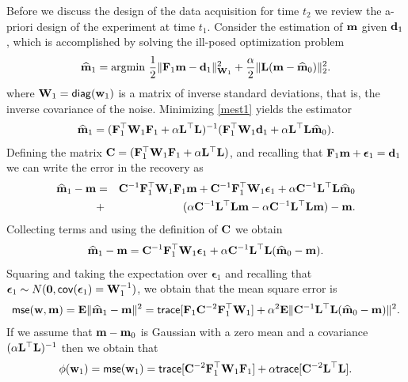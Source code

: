 \documentclass[11pt]{article}
\newcommand{\bfC}	{{\bf{C}}}
\newcommand{\bfE}	{{\bf{E}}}
\newcommand{\bfF}	{{\bf{F}}}
\newcommand{\bfL}	{{\bf{L}}}
\newcommand{\bfW}	{{\bf{W}}}
\newcommand{\bfd}	{{\bf{d}}}
\newcommand{\bfm}	{{\bf{m}}}
\newcommand{\bfw}	{{\bf{w}}}
\newcommand{\hf}        {{\frac 12}}
\newcommand{\bfepsilon} {{\boldsymbol \epsilon}}
\newcommand{\LtL}       { \bfL^{\top}\bfL}
\newcommand {\zero}  { {\bf 0} }
\renewcommand{\hf}		 {\frac12}
\newcommand{\bfmhat}    {{\widehat{\bfm}}}
\begin{document}
Before we discuss the design of the data acquisition for time $t_{2}$
 we review the a-priori design of the experiment at time $t_{1}$.  
Consider  the estimation of $\bfm$ given $\bfd_{1}$, which is accomplished by solving the ill-posed optimization problem
\begin{eqnarray*}
\label{mest1}
\widehat \bfm_{1} = {\rm arg}{\min} \ \hf \| \bfF_{1} \bfm - \bfd_{1}\|^{2}_{\bfW_{1}} + {\frac {\alpha} 2}
\|\bfL (\bfm - \bfmhat_{0}) \|^{2}_2. 
\end{eqnarray*}
where $\bfW_{1} = {\sf diag}(\bfw_{1})$ is a matrix of inverse standard deviations, 
that is, the inverse covariance of the noise.
Minimizing \eqref{mest1} yields the estimator
\begin{eqnarray}
\label{mest}
\widehat \bfm_{1} = (\bfF_{1}^{\top} \bfW_{1}\bfF_{1} + \alpha \bfL^{\top} \bfL)^{-1} (\bfF_{1}^{\top} \bfW_{1} \bfd_{1}
+ \alpha \LtL \bfmhat_{0}).
\end{eqnarray}
Defining the matrix $\bfC = (\bfF_{1}^{\top} \bfW_{1}\bfF_{1} + \alpha \LtL)$, and recalling that $\bfF_1\bfm + \bfepsilon_1 = \bfd_1$ we can write
the error in the recovery as
\begin{eqnarray}
\bfmhat_1 -\bfm &=& \bfC^{-1} \bfF_{1}^{\top} \bfW_{1}\bfF_{1} \bfm + \bfC^{-1} \bfF_{1}^{\top} \bfW_{1}\bfepsilon_1 + \alpha
\bfC^{-1} \LtL \bfmhat_{0} \\
\nonumber
&+& (\alpha \bfC^{-1} \LtL\bfm
- \alpha \bfC^{-1} \LtL \bfm) 
 -\bfm.
\end{eqnarray}
Collecting terms and using the definition of $\bfC$ we obtain
\begin{eqnarray}
\label{diffmod}
\bfmhat_1 -\bfm = \bfC^{-1} \bfF_{1}^{\top} \bfW_{1} \bfepsilon_1 + \alpha \bfC^{-1} \LtL (\bfmhat_{0} - \bfm).
\end{eqnarray}
Squaring and taking the expectation over $\bfepsilon_1$ and recalling that $ \bfepsilon_1 \sim N(\zero,{\sf cov}(\bfepsilon_1) = \bfW_{1}^{-1})$, we obtain that the mean square error is
\begin{eqnarray}
{\sf mse}(\bfw,\bfm) = \bfE\| \bfmhat_1 -\bfm \|^{2} = {\sf trace}[   \bfF_{1} \bfC^{-2} \bfF_{1}^{\top} \bfW_{1}]  + 
\alpha^2 \bfE\| \bfC^{-1} \LtL (\bfmhat_{0} - \bfm) \|^{2}.
\end{eqnarray}
If we assume that $\bfm-\bfm_{0}$ is Gaussian with a zero mean and a covariance
$(\alpha \LtL)^{-1}$ then we obtain that
\begin{eqnarray}
\phi(\bfw_1 ) = {\sf mse}(\bfw_1) = {\sf trace}[    \bfC^{-2} \bfF_{1}^{\top}\bfW_{1}\bfF_{1}]  + 
 \alpha {\sf trace} [\bfC^{-2} \LtL] . 
\end{eqnarray}
\end{document}
